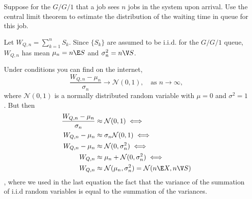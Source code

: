 \begin{exercise}
 Suppose for the $G/G/1$ that a job sees $n$ jobs in the system upon arrival.
 Use the central limit theorem to estimate the distribution of the waiting time in queue for this job.
\begin{hint}
 Let $W_{Q,n} = \sum_{k=1}^n S_k$.
 Since $\{S_k\}$ are assumed to be i.i.d.
 for the $G/G/1$ queue, $W_{Q,n}$ has mean $\mu_n = n \E S$ and $\sigma_n^2 = n\V S$.
\end{hint}
\begin{solution} Under conditions you can find on the internet,
 \begin{equation*}
 \frac{W_{Q,n} - \mu_n}{\sigma_n} \to \mathcal{N}(0,1), \quad\text{as } n\to \infty,
 \end{equation*}
 where $\mathcal{N}(0,1)$ is a normally distributed random variable
 with $\mu=0$ and $\sigma^2=1$. But then 
 \begin{align*}
 \frac{W_{Q,n} - \mu_n}{\sigma_n} &\approx \mathcal{N}(0,1) \iff\\
 W_{Q,n} - \mu_n &\approx \sigma_n \mathcal{N}(0,1) \iff\\
 W_{Q,n} - \mu_n &\approx \mathcal{N}(0,\sigma_n^2) \iff\\
 W_{Q,n} &\approx \mu_n + \mathcal{N}(0,\sigma_n^2) \iff\\
 W_{Q,n} &\approx \mathcal{N}(\mu_n,\sigma_n^2) = \mathcal{N}(n\E X, n \V S)
 \end{align*}
, where we used in the last equation the fact that the variance of the summation of i.i.d random variables is equal to the summation of the variances.
\end{solution}
\end{exercise}




